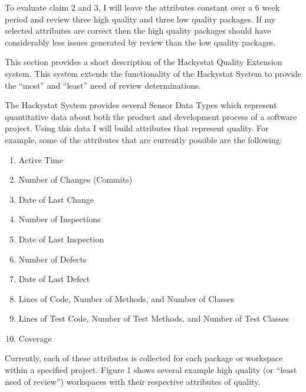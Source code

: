 \documentclass[11pt,twocolumn]{article}
\begin{document}
To evaluate claim 2 and 3, I will leave the attributes constant over a 6
week period and review three high quality and three low quality packages.
If my selected attributes are correct then the high quality packages should
have considerably less issues generated by review than the low quality
packages.

This section provides a short description of the Hackystat Quality
Extension system. This system extends the functionality of the Hackystat
System to provide the ``most'' and ``least'' need of review determinations.

The Hackystat System provides several Sensor Data Types which represent
quantitative data about both the product and development process of a
software project. Using this data I will build attributes that represent
quality. For example, some of the attributes that are currently possible
are the following:

\begin{enumerate}
\item Active Time
\item Number of Changes (Commits)
\item Date of Last Change
\item Number of Inspections
\item Date of Last Inspection
\item Number of Defects
\item Date of Last Defect
\item Lines of Code, Number of Methods, and Number of Classes
\item Lines of Test Code, Number of Test Methods, and Number of Test
Classes
\item Coverage
\end{enumerate}

Currently, each of these attributes is collected for each package or
workspace within a specified project. Figure 1 shows several example high
quality (or ``least need of review'') workspaces with their respective
attributes of quality.
\end{document}
